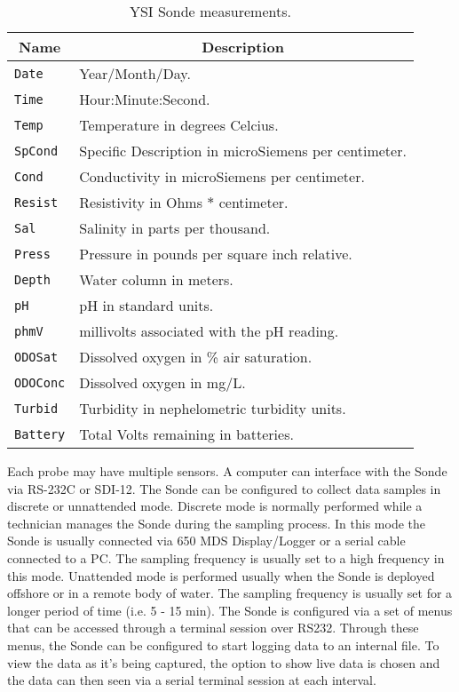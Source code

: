 \documentclass[conference]{IEEEtran}
\begin{document}
\begin{table}[h]
\caption{\label{TAB_SONDE_MEASUREMENTS} YSI Sonde measurements.}
\centering
\begin{tabular}{|l||l|}
\hline
\multicolumn{1}{|c||}{\textbf{Name}} &
\multicolumn{1}{c|}{\textbf{Description}} \\ \hline \hline
\texttt{Date}    & Year/Month/Day. \\ \hline
\texttt{Time}    & Hour:Minute:Second. \\ \hline
\texttt{Temp}    & Temperature in degrees Celcius. \\ \hline
\texttt{SpCond}  & Specific Description in microSiemens
                   per centimeter. \\ \hline
\texttt{Cond}    & Conductivity in microSiemens per centimeter. \\ \hline
\texttt{Resist}  & Resistivity in Ohms $*$ centimeter. \\ \hline
\texttt{Sal}     & Salinity in parts per thousand. \\ \hline
\texttt{Press}   & Pressure in pounds per square inch relative. \\ \hline
\texttt{Depth}   & Water column in meters. \\ \hline
\texttt{pH}      & pH in standard units. \\ \hline
\texttt{phmV}    & millivolts associated with the pH reading. \\ \hline
\texttt{ODOSat}  & Dissolved oxygen in \% air saturation. \\ \hline
\texttt{ODOConc} & Dissolved oxygen in mg/L. \\ \hline
\texttt{Turbid}  & Turbidity in nephelometric turbidity units. \\ \hline
\texttt{Battery} & Total Volts remaining in batteries.  \\ \hline
\end{tabular}
\end{table}


Each probe may have multiple sensors.  A computer can interface with
the Sonde via RS-232C or SDI-12. The Sonde can be configured to
collect data samples in discrete or unnattended mode.  Discrete mode
is normally performed while a technician manages the Sonde during the
sampling process. In this mode the Sonde is usually connected via 650
MDS Display/Logger or a serial cable connected to a PC.  The sampling
frequency is usually set to a high frequency in this mode.  Unattended
mode is performed usually when the Sonde is deployed offshore or in a
remote body of water.  The sampling frequency is usually set for a
longer period of time (i.e. 5 - 15 min). The Sonde is configured via a
set of menus that can be accessed through a terminal session over
RS232. Through these menus, the Sonde can be configured to start
logging data to an internal file.  To view the data as it's being
captured, the option to show live data is chosen and the data can then
seen via a serial terminal session at each interval.
\end{document}

